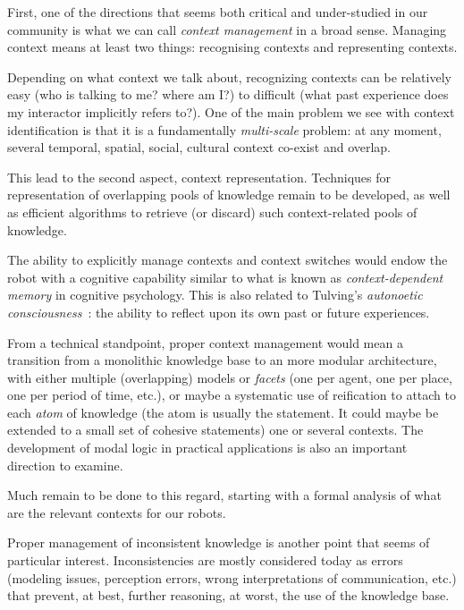 First, one of the directions that seems both critical and under-studied in our
community is what we can call \emph{context management} in a broad sense.
Managing context means at least two things: recognising contexts and
representing contexts.

Depending on what context we talk about, recognizing contexts can be relatively
easy (who is talking to me? where am I?) to difficult (what past experience
does my interactor implicitly refers to?). One of the main problem we see
with context identification is that it is a fundamentally \emph{multi-scale}
problem: at any moment, several temporal, spatial, social, cultural context
co-exist and overlap.

This lead to the second aspect, context representation. Techniques for
representation of overlapping pools of knowledge remain to be developed, as
well as efficient algorithms to retrieve (or discard) such context-related
pools of knowledge.

The ability to explicitly manage contexts and context switches would endow the
robot with a cognitive capability similar to what is known as
\emph{context-dependent memory} in cognitive psychology. This is also related to
Tulving's \emph{autonoetic consciousness}~\cite{Tulving1985a}: the ability to
reflect upon its own past or future experiences.

From a technical standpoint, proper context management would mean a transition
from a monolithic knowledge base to an more modular architecture, with either
multiple (overlapping) models or \emph{facets} (one per agent, one per place,
one per period of time, etc.), or maybe a systematic use of reification to
attach to each \emph{atom} of knowledge (the atom is usually the statement. It
could maybe be extended to a small set of cohesive statements) one or several
contexts. The development of modal logic in practical applications is also an
important direction to examine.

Much remain to be done to this regard, starting with a formal analysis of what
are the relevant contexts for our robots.

\par

Proper management of inconsistent knowledge is another point that seems of
particular interest. Inconsistencies are mostly considered today as errors
(modeling issues, perception errors, wrong interpretations of communication, etc.)
that prevent, at best, further reasoning, at worst, the use of the knowledge base.

